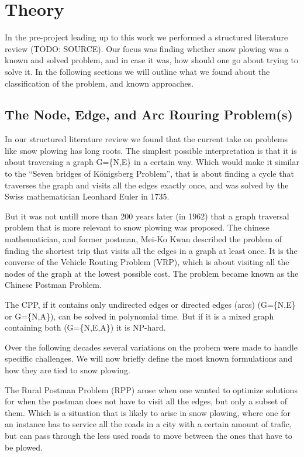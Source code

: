 \chapter{Theory}

In the pre-project leading up to this work we performed a structured literature review (TODO: SOURCE). Our focus was finding whether snow plowing was a known and solved problem, and in case it was, how should one go about trying to solve it. In the following sections we will outline what we found about the classification of the problem, and known approaches.

\section{The Node, Edge, and Arc Rouring Problem(s)}
\label{the_nearp}
In our structured literature review we found that the current take on problems like snow plowing has long roots. The simplest possible interpretation is that it is about traversing a graph G=\{N,E\} in a certain way. Which would make it similar to the “Seven bridges of Königsberg Problem”, that is about finding a cycle that traverses the graph and visits all the edges exactly once, and was solved by the Swiss mathematician Leonhard Euler in 1735.

But it was not untill more than 200 years later (in 1962) that a graph traversal problem that is more relevant to snow plowing was proposed. The chinese mathematician, and former postman, Mei-Ko Kwan described the problem of finding the shortest trip that visits all the edges in a graph at least once. It is the converse of the Vehicle Routing Problem (VRP), which is about visiting all the nodes of the graph at the lowest possible cost. The problem became known as the Chinese Postman Problem.

The CPP, if it contains only undirected edges or directed edges (arcs) (G=\{N,E\} or G=\{N,A\}), can be solved in polynomial time. But if it is a mixed graph containing both (G=\{N,E,A\}) it is NP-hard.

Over the following decades several variations on the probem were made to handle speciffic challenges. We will now briefly define the most known formulations and how they are tied to snow plowing.

The Rural Postman Problem (RPP) arose when one wanted to optimize solutions for when the postman does not have to visit all the edges, but only a subset of them. Which is a situation that is likely to arise in snow plowing, where one for an instance has to service all the roads in a city with a certain amount of trafic, but can pass through the less used roads to move between the ones that have to be plowed.

